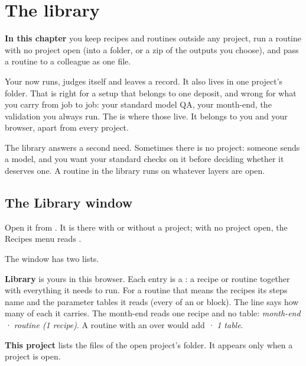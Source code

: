 \chapter{The library}\label{ch:library}
\begin{goals}
\textbf{In this chapter} you keep recipes and routines outside any project, run a routine with no project open (into a folder, or a zip of the outputs you choose), and pass a routine to a colleague as one file.
\end{goals}

Your  now runs, judges itself and leaves a record. It also lives in one project's  folder. That is right for a setup that belongs to one deposit, and wrong for what you carry from job to job: your standard model QA, your month-end, the validation you always run. The  is where those live. It belongs to you and your browser, apart from every project.

The library answers a second need. Sometimes there is no project: someone sends a model, and you want your standard checks on it before deciding whether it deserves one. A routine in the library runs on whatever layers are open.

\section{The Library window}\label{sec:library-window}
Open it from . It is there with or without a project; with no project open, the Recipes menu reads .


The window has two lists.

\textbf{Library} is yours in this browser. Each entry is a : a recipe or routine together with everything it needs to run. For a routine that means the recipes its steps name and the parameter tables it reads (every  of an  or  block). The line says how many of each it carries. The month-end reads one recipe and no table: \emph{month-end · routine (1 recipe)}. A routine with an  over  would add \emph{· 1 table}.

\textbf{This project} lists the files of the open project's  folder. It appears only when a project is open.

